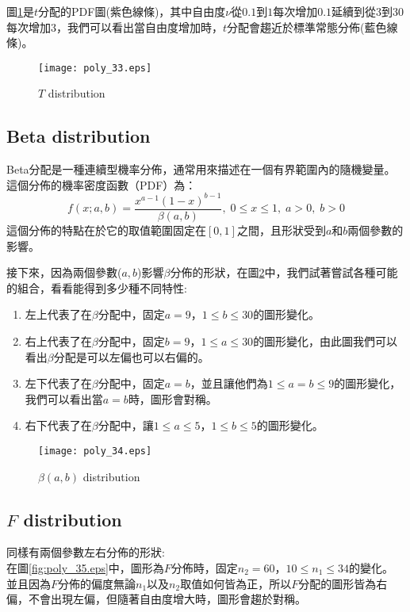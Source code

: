 \documentclass[12pt, a4paper]{article}
\begin{document}
圖\;\ref{fig:poly_33.eps}\;是$t$分配的PDF圖(紫色線條)，其中自由度$\nu $從$0.1$到\;$1$\;每次增加\;$0.1$\;延續到從$3$到\;$30$\;每次增加\;$3$\;，我們可以看出當自由度增加時，\;$t$\;分配會趨近於標準常態分佈(藍色線條)。
\begin{figure}[H]
\centering
\texttt{[image: poly\_33.eps]}
\caption{$T$ distribution}
\label{fig:poly_33.eps}
\end{figure} 



\subsection{Beta distribution}
Beta分配是一種連續型機率分佈，通常用來描述在一個有界範圍內的隨機變量。這個分佈的機率密度函數（PDF）為：
$$f(x;a,b)=\frac{x^{a-1}(1-x)^{b-1}}{\beta(a,b)},\;0\leq x \leq 1,\;a>0,\;b>0$$ 
這個分佈的特點在於它的取值範圍固定在\;$[0, 1]$\;之間，且形狀受到\;$a$\;和\;$b$\;兩個參數的影響。 

接下來，因為兩個參數(\;$a, b$\;)影響\;$\beta$\;分佈的形狀，在圖\;\ref{fig:poly_34.eps}\;中，我們試著嘗試各種可能的組合，看看能得到多少種不同特性\;:\\
\begin{enumerate}
\item 左上代表了在\;$\beta$\;分配中，固定\;$a=9$\;，\;$1 \leq b \leq 30$\;的圖形變化。
\item 右上代表了在\;$\beta$\;分配中，固定\;$b=9$\;，\;$1 \leq a \leq 30$\;的圖形變化，由此圖我們可以看出\;$\beta$\;分配是可以左偏也可以右偏的。
\item 左下代表了在\;$\beta$\;分配中，固定\;$a=b$\;，並且讓他們為\;$1 \leq a=b \leq 9$\;的圖形變化，我們可以看出當\;$a=b$\;時，圖形會對稱。
\item 右下代表了在\;$\beta$\;分配中，讓\;$1 \leq a \leq 5$\;，\;$1 \leq b \leq 5$\;的圖形變化。
\end{enumerate}

\begin{figure}[h]
\centering
\texttt{[image: poly\_34.eps]}
\caption{$\beta(a, b)$ distribution}
\label{fig:poly_34.eps}
\end{figure}

\subsection{$F$ distribution} 

同樣有兩個參數左右分佈的形狀\;:\\
在圖\;\ref{fig:poly_35.eps}\;中，圖形為\;$F$\;分佈時，固定\;$n_2=60$\;，\;$10 \leq n_1 \leq 34$\;的變化。
並且因為\;$F$\;分佈的偏度無論\;$n_1$\;以及\;$n_2$\;取值如何皆為正，所以\;$F$\;分配的圖形皆為右偏，不會出現左偏，但隨著自由度增大時，圖形會趨於對稱。
\end{document}
